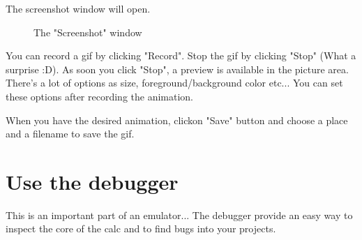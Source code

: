 \documentclass[10pt]{report}
\begin{document}
The screenshot window will open.\newline
\begin{figure}[H]
\centering
{}
\caption{The "Screenshot" window}
\end{figure}

You can record a gif by clicking "Record".\newline
Stop the gif by clicking "Stop" (What a surprise :D).\newline
As soon you click "Stop", a preview is available in the picture area.\newline
There's a lot of options as size, foreground/background color etc...\newline
You can set these options after recording the animation.\newline

When you have the desired animation, clickon "Save" button and choose a place and a filename to save the gif.\newline

\section{Use the debugger}
This is an important part of an emulator...\newline
The debugger provide an easy way to inspect the core of the calc and to find bugs into your projects.\newline
\end{document}
